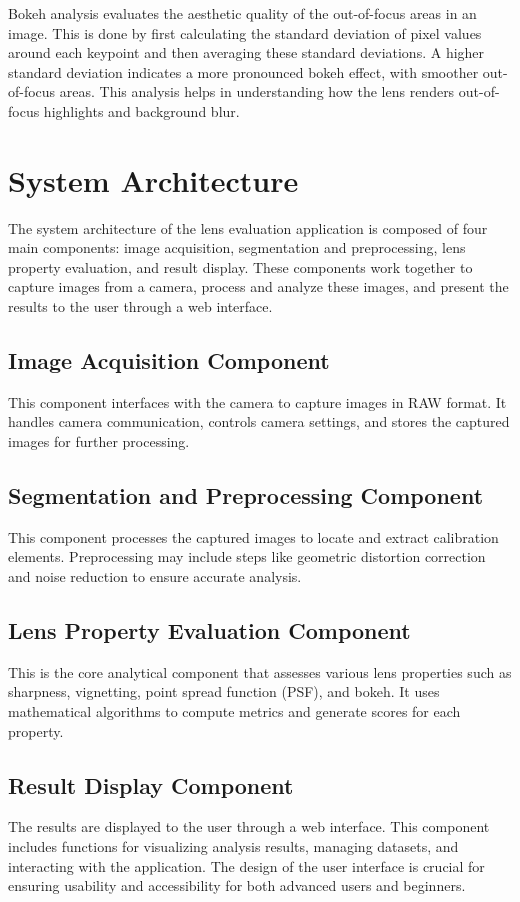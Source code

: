 Bokeh analysis evaluates the aesthetic quality of the out-of-focus areas in an image. This is done by first calculating the standard deviation of pixel values around each keypoint and then averaging these standard deviations. A higher standard deviation indicates a more pronounced bokeh effect, with smoother out-of-focus areas. This analysis helps in understanding how the lens renders out-of-focus highlights and background blur.

\section{System Architecture}

The system architecture of the lens evaluation application is composed of four main components: image acquisition, segmentation and preprocessing, lens property evaluation, and result display. These components work together to capture images from a camera, process and analyze these images, and present the results to the user through a web interface.

\subsection{Image Acquisition Component}
This component interfaces with the camera to capture images in RAW format. It handles camera communication, controls camera settings, and stores the captured images for further processing.

\subsection{Segmentation and Preprocessing Component}
This component processes the captured images to locate and extract calibration elements. Preprocessing may include steps like geometric distortion correction and noise reduction to ensure accurate analysis.

\subsection{Lens Property Evaluation Component}
This is the core analytical component that assesses various lens properties such as sharpness, vignetting, point spread function (PSF), and bokeh. It uses mathematical algorithms to compute metrics and generate scores for each property.

\subsection{Result Display Component}
The results are displayed to the user through a web interface. This component includes functions for visualizing analysis results, managing datasets, and interacting with the application. The design of the user interface is crucial for ensuring usability and accessibility for both advanced users and beginners.

